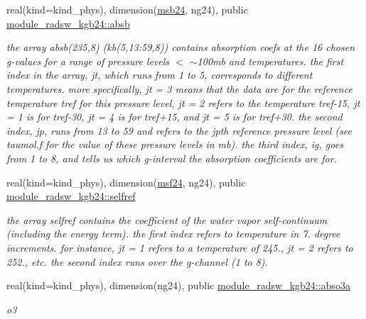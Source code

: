 \begin{DoxyCompactItemize}
real(kind=kind\+\_\+phys), dimension(\hyperlink{group__module__radsw__kgbnn_ga0ec09b4df9fbfa868844ad93a84cbe31}{msb24}, ng24), public \hyperlink{group__module__radsw__kgbnn_gabd4db3c9678fee17f2cfd4a3e290619a}{module\+\_\+radsw\+\_\+kgb24\+::absb}
\begin{DoxyCompactList}\small\item\em the array absb(235,8) (kb(5,13\+:59,8)) contains absorption coefs at the 16 chosen g-\/values for a range of pressure levels $<$ $\sim$100mb and temperatures. the first index in the array, jt, which runs from 1 to 5, corresponds to different temperatures. more specifically, jt = 3 means that the data are for the reference temperature tref for this pressure level, jt = 2 refers to the temperature tref-\/15, jt = 1 is for tref-\/30, jt = 4 is for tref+15, and jt = 5 is for tref+30. the second index, jp, runs from 13 to 59 and refers to the jpth reference pressure level (see taumol.\+f for the value of these pressure levels in mb). the third index, ig, goes from 1 to 8, and tells us which g-\/interval the absorption coefficients are for. \end{DoxyCompactList}\item 
\mbox{\label{group__module__radsw__kgbnn_ga784e78b5964fadd3e3e1f57f7af30802}} 
real(kind=kind\+\_\+phys), dimension(\hyperlink{group__module__radsw__kgbnn_ga52d0fde0af1d5427acf0d1924f393cdc}{msf24}, ng24), public \hyperlink{group__module__radsw__kgbnn_ga784e78b5964fadd3e3e1f57f7af30802}{module\+\_\+radsw\+\_\+kgb24\+::selfref}
\begin{DoxyCompactList}\small\item\em the array selfref contains the coefficient of the water vapor self-\/continuum (including the energy term). the first index refers to temperature in 7. degree increments. for instance, jt = 1 refers to a temperature of 245., jt = 2 refers to 252., etc. the second index runs over the g-\/channel (1 to 8). \end{DoxyCompactList}\item 
\mbox{\label{group__module__radsw__kgbnn_ga3df78e9baa46df182aad6ff9b1662dc4}} 
real(kind=kind\+\_\+phys), dimension(ng24), public \hyperlink{group__module__radsw__kgbnn_ga3df78e9baa46df182aad6ff9b1662dc4}{module\+\_\+radsw\+\_\+kgb24\+::abso3a}
\begin{DoxyCompactList}\small\item\em o3 \end{DoxyCompactList}\item 

\end{DoxyCompactItemize}

